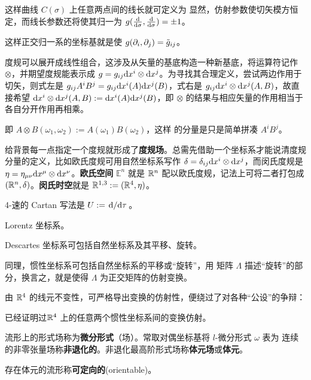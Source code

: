  这样曲线 $C(\sigma)$ 上任意两点间的线长就可定义为
 显然，仿射参数使切矢模方恒定，而线长参数还将使其归一为 $g(\dv{\sigma},\dv{\sigma})=\pm 1$。

 这样正交归一系的坐标基就是使 $g(\partial_i,\partial_j)=\tilde g_{ij}$。

度规可以展开成线性组合，这涉及从矢量的基底构造一种新基底，将运算符记作 $\otimes$，并期望度规能表示成 $g=g_{ij}\dd x^i\otimes\dd x^j$。为寻找其合理定义，尝试两边作用于切矢，则式左是 $g_{ij}A^i B^j=g_{ij} \dd x^i(A)\dd x^j(B)$，式右是 $g_{ij}\dd x^i\otimes\dd x^j(A,B)$，故直接希望 
$\dd x^i\otimes\dd x^j(A,B):=\dd x^i(A)\dd x^j(B)$，即 $\otimes$ 的结果与相应矢量的作用相当于各自分开作用再相乘。

即 $A\otimes B(\omega_1,\omega_2):=A(\omega_1)B(\omega_2)$，这样 的分量是只是简单拼凑 $A^i B^j$。

给背景每一点指定一个度规就形成了\textbf{度规场}。总需先借助一个坐标系才能说清度规分量的定义，比如欧氏度规可用自然坐标系写作 $\delta=\delta_{ij}\dd x^i\otimes\dd x^j$，而闵氏度规是 $\eta=\eta_{\mu\nu}\dd x^\mu\otimes\dd x^\nu$。\textbf{欧氏空间} $\mathbb{E}^n$ 就是 $\mathbb{R}^n$ 配以欧氏度规，记法上可将二者打包成 $(\mathbb{R}^n,\delta)$。\textbf{闵氏时空}就是 $\mathbb{R}^{1,3}:=(\mathbb{R}^4,\eta)$。

4-速的 Cartan 写法是 $U:=\dv*{\tau}$。 

Lorentz 坐标系。

Descartes 坐标系可包括自然坐标系及其平移、旋转。

同理，惯性坐标系可包括自然坐标系的平移或“旋转”，用 矩阵 $\Lambda$ 描述“旋转”的部分，换言之，就是使得 $\Lambda$ 为正交矩阵的仿射变换。

由 $\mathbb{R}^4$ 的线元不变性，可严格导出变换的仿射性，便绕过了对各种“公设”的争辩：

已经证明过$\mathbb{R}^4$ 上的任意两个惯性坐标系间的变换仿射。



\begin{definition}
    流形上的形式场称为\textbf{微分形式}（场）。常取对偶坐标基将 $l$-微分形式 $\omega$ 表为
    连续的非零张量场称\textbf{非退化的}。非退化最高阶形式场称\textbf{体元场}或\textbf{体元}。
\end{definition}

\begin{definition}
    存在体元的流形称\textbf{可定向的}(orientable)。
\end{definition}

